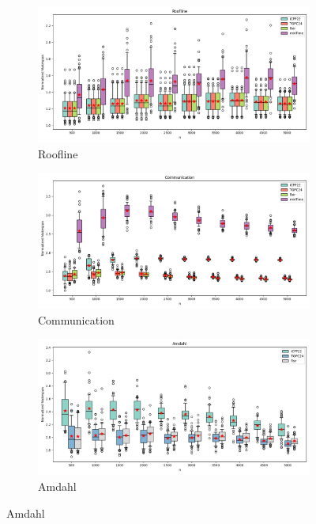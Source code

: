 \documentclass{article}
\begin{document}
\begin{figure}[htbp]
\centering
\begin{subfigure}[b]{0.32\textwidth}\includegraphics[width=\textwidth]{Results/n/n_Roofline_boxplot}\caption{Roofline}\label{fig:boxplot_figures_n_Roofline}\end{subfigure}
\hfill
\begin{subfigure}[b]{0.32\textwidth}\includegraphics[width=\textwidth]{Results/n/n_Communication_boxplot}\caption{Communication}\label{fig:boxplot_figures_n_Communication}\end{subfigure}
\hfill
\begin{subfigure}[b]{0.32\textwidth}\includegraphics[width=\textwidth]{Results/n/n_Amdahl_boxplot}\caption{Amdahl}\label{fig:boxplot_figures_n_Amdahl}\end{subfigure}

\end{figure}
\end{document}
